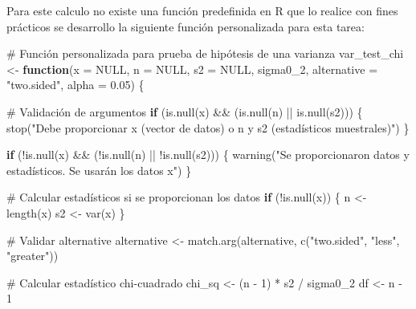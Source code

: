 \documentclass[
  spanish,
  letterpaper,
]{book}
\newenvironment{Shaded}{\begin{snugshade}}{\end{snugshade}}
\newcommand{\AttributeTok}[1]{\textcolor[rgb]{0.40,0.45,0.13}{#1}}
\newcommand{\CommentTok}[1]{\textcolor[rgb]{0.37,0.37,0.37}{#1}}
\newcommand{\ConstantTok}[1]{\textcolor[rgb]{0.56,0.35,0.01}{#1}}
\newcommand{\ControlFlowTok}[1]{\textcolor[rgb]{0.00,0.23,0.31}{\textbf{#1}}}
\newcommand{\DecValTok}[1]{\textcolor[rgb]{0.68,0.00,0.00}{#1}}
\newcommand{\FloatTok}[1]{\textcolor[rgb]{0.68,0.00,0.00}{#1}}
\newcommand{\FunctionTok}[1]{\textcolor[rgb]{0.28,0.35,0.67}{#1}}
\newcommand{\NormalTok}[1]{\textcolor[rgb]{0.00,0.23,0.31}{#1}}
\newcommand{\OtherTok}[1]{\textcolor[rgb]{0.00,0.23,0.31}{#1}}
\newcommand{\SpecialCharTok}[1]{\textcolor[rgb]{0.37,0.37,0.37}{#1}}
\newcommand{\StringTok}[1]{\textcolor[rgb]{0.13,0.47,0.30}{#1}}
\begin{document}
Para este calculo no existe una función predefinida en R que lo realice
con fines prácticos se desarrollo la siguiente función personalizada
para esta tarea:

\begin{Shaded}
\begin{Highlighting}[]
\CommentTok{\# Función personalizada para prueba de hipótesis de una varianza}
\NormalTok{var\_test\_chi }\OtherTok{\textless{}{-}} \ControlFlowTok{function}\NormalTok{(}\AttributeTok{x =} \ConstantTok{NULL}\NormalTok{, }\AttributeTok{n =} \ConstantTok{NULL}\NormalTok{, }\AttributeTok{s2 =} \ConstantTok{NULL}\NormalTok{, sigma0\_2, }
                           \AttributeTok{alternative =} \StringTok{"two.sided"}\NormalTok{, }\AttributeTok{alpha =} \FloatTok{0.05}\NormalTok{) \{}
  
  \CommentTok{\# Validación de argumentos}
  \ControlFlowTok{if}\NormalTok{ (}\FunctionTok{is.null}\NormalTok{(x) }\SpecialCharTok{\&\&}\NormalTok{ (}\FunctionTok{is.null}\NormalTok{(n) }\SpecialCharTok{||} \FunctionTok{is.null}\NormalTok{(s2))) \{}
    \FunctionTok{stop}\NormalTok{(}\StringTok{"Debe proporcionar \textquotesingle{}x\textquotesingle{} (vector de datos) o \textquotesingle{}n\textquotesingle{} y \textquotesingle{}s2\textquotesingle{} (estadísticos muestrales)"}\NormalTok{)}
\NormalTok{  \}}
  
  \ControlFlowTok{if}\NormalTok{ (}\SpecialCharTok{!}\FunctionTok{is.null}\NormalTok{(x) }\SpecialCharTok{\&\&}\NormalTok{ (}\SpecialCharTok{!}\FunctionTok{is.null}\NormalTok{(n) }\SpecialCharTok{||} \SpecialCharTok{!}\FunctionTok{is.null}\NormalTok{(s2))) \{}
    \FunctionTok{warning}\NormalTok{(}\StringTok{"Se proporcionaron datos y estadísticos. Se usarán los datos \textquotesingle{}x\textquotesingle{}"}\NormalTok{)}
\NormalTok{  \}}
  
  \CommentTok{\# Calcular estadísticos si se proporcionan los datos}
  \ControlFlowTok{if}\NormalTok{ (}\SpecialCharTok{!}\FunctionTok{is.null}\NormalTok{(x)) \{}
\NormalTok{    n }\OtherTok{\textless{}{-}} \FunctionTok{length}\NormalTok{(x)}
\NormalTok{    s2 }\OtherTok{\textless{}{-}} \FunctionTok{var}\NormalTok{(x)}
\NormalTok{  \}}
  
  \CommentTok{\# Validar alternative}
\NormalTok{  alternative }\OtherTok{\textless{}{-}} \FunctionTok{match.arg}\NormalTok{(alternative, }\FunctionTok{c}\NormalTok{(}\StringTok{"two.sided"}\NormalTok{, }\StringTok{"less"}\NormalTok{, }\StringTok{"greater"}\NormalTok{))}
  
  \CommentTok{\# Calcular estadístico chi{-}cuadrado}
\NormalTok{  chi\_sq }\OtherTok{\textless{}{-}}\NormalTok{ (n }\SpecialCharTok{{-}} \DecValTok{1}\NormalTok{) }\SpecialCharTok{*}\NormalTok{ s2 }\SpecialCharTok{/}\NormalTok{ sigma0\_2}
\NormalTok{  df }\OtherTok{\textless{}{-}}\NormalTok{ n }\SpecialCharTok{{-}} \DecValTok{1}
  

\end{Highlighting}
\end{Shaded}
\end{document}
